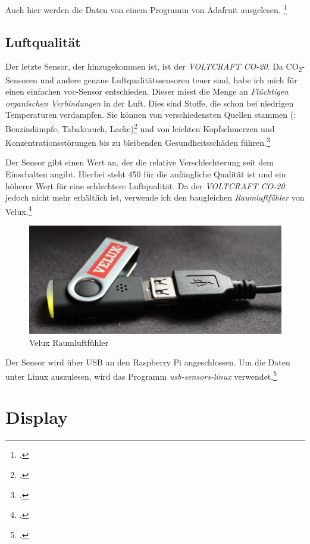 Auch hier werden die Daten von einem Programm von Adafruit ausgelesen. \footcite[Using the Adafruit BMP Python Library (Updated)]{bmp058_adafruit}

\subsection{Luftqualität}
\label{subsec:Luftqualitat}
Der letzte Sensor, der hinzugekommen ist, ist der \emph{VOLTCRAFT CO-20}. Da CO\textsubscript{2}-Sensoren und andere genaue Luftqualitätssensoren teuer sind, habe ich mich für einen einfachen \acrshort{voc}-Sensor entschieden. Dieser misst die Menge an \emph{Flüchtigen organischen Verbindungen} in der Luft. Dies sind Stoffe, die schon bei niedrigen Temperaturen verdampfen. Sie können von verschiedensten Quellen stammen (\zB: Benzindämpfe, Tabakrauch, Lacke)\footcite[41\psqq]{innenraum} und von leichten Kopfschmerzen und Konzentrationsstörungen bis zu bleibenden Gesundheitsschäden führen.\footcite[Gesundheitliche Wirkung]{VOC}

Der Sensor gibt einen Wert an, der die relative Verschlechterung seit dem Einschalten angibt. Hierbei steht 450 für die anfängliche Qualität ist und ein höherer Wert für eine schlechtere Luftqualität.
Da der \emph{VOLTCRAFT CO-20} jedoch nicht mehr erhältlich ist, verwende ich den baugleichen \emph{Raumluftfühler} von Velux.\footcite{Velux}

\begin{figure}[h]
  \centering
     \includegraphics[width=\textwidth]{figures/velux.jpg}
  \caption{Velux Raumluftfühler}
  \label{fig:velux}
\end{figure}

Der Sensor wird über USB an den Raspberry Pi angeschlossen. Um die Daten unter Linux auszulesen, wird das Programm \emph{usb-sensors-linux} verwendet.\footcite{usb-sensors-linux}

\section{Display}
\label{sec:Display}

